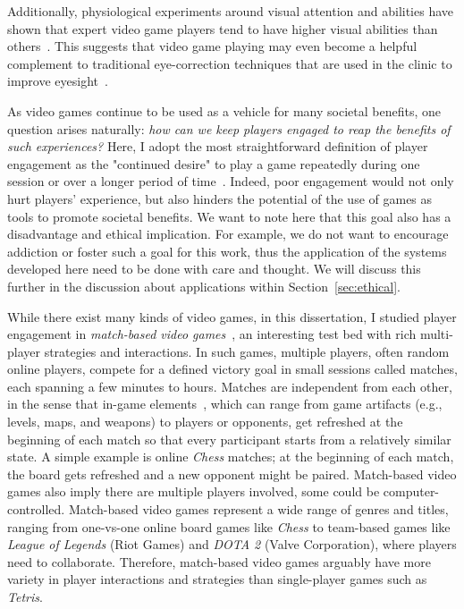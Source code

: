 Additionally, physiological experiments around visual attention and abilities have shown that expert video game players tend to have higher visual abilities than others~\citep{green2003action,li2009enhancing}. This suggests that video game playing may even become a helpful complement to traditional eye-correction techniques that are used in the clinic to improve eyesight~\citep{li2009enhancing}.

As video games continue to be used as a vehicle for many societal benefits, one question arises naturally: \textit{how can we keep players engaged to reap the benefits of such experiences?} Here, I adopt the most straightforward definition of player engagement as the "continued desire" to play a game repeatedly during one session or over a longer period of time~\citep{schoenau2011player}. Indeed, poor engagement would not only hurt players' experience, but also hinders the potential of the use of  games as tools to promote societal benefits. We want to note here that this goal also has a disadvantage and ethical implication. For example, we do not want to encourage addiction or foster such a goal for this work, thus the application of the systems developed here need to be done with care and thought. We will discuss this further in the discussion about applications within Section~\ref{sec:ethical}.  


While there exist many kinds of video games, in this dissertation, I studied player engagement in \textit{match-based video games}~\citep{guo2012analysis}, an interesting test bed with rich multi-player strategies and interactions. In such games, multiple players, often random online players, compete for a defined victory goal in small sessions called matches, each spanning a few minutes to hours. Matches are independent from each other, in the sense that in-game elements~\citep{ralph2015toward,fullerton2008game}, which can range from game artifacts (e.g., levels, maps, and weapons) to players or opponents, get refreshed at the beginning of each match so that every participant starts from a relatively similar state. A simple example is online \textit{Chess} matches; at the beginning of each match, the board gets refreshed and a new opponent might be paired. Match-based video games also imply there are multiple players involved, some could be computer-controlled. Match-based video games represent a wide range of genres and titles, ranging from one-vs-one online board games like \textit{Chess} to team-based games like \textit{League of Legends} (Riot Games) and \textit{DOTA 2} (Valve Corporation), where players need to collaborate. Therefore, match-based video games arguably have more variety in player interactions and strategies than single-player games such as \textit{Tetris}. 

